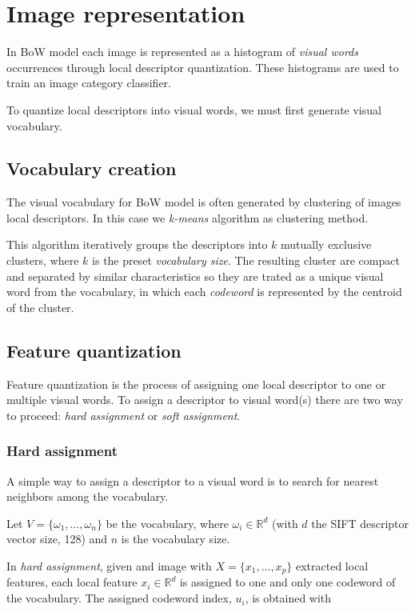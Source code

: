 \section{Image representation}

In BoW model each image is represented as a histogram of \emph{visual words} occurrences through local descriptor quantization\cite{DBLP:journals/corr/abs-1304-5168}. These histograms are used to train an image category classifier.

To quantize local descriptors into visual words, we must first generate visual vocabulary. 

\subsection{Vocabulary creation}

The visual vocabulary for BoW model is often generated by clustering of images local descriptors. In this case we \emph{k-means} algorithm as clustering method.

This algorithm iteratively groups the descriptors into $k$ mutually exclusive clusters, where $k$ is the preset \emph{vocabulary size}. The resulting cluster are compact and separated by similar characteristics so they are trated as a unique visual word from the vocabulary, in which each \emph{codeword} is represented by the centroid of the cluster.

\subsection{Feature quantization}

Feature quantization is the process of assigning one local descriptor to one or multiple
visual words. To assign a descriptor to visual word(s) there are two way to proceed: \emph{hard assignment} or \emph{soft assignment}.

\subsubsection{Hard assignment}

A simple way to assign a descriptor to a visual word is to search for nearest neighbors among the vocabulary.

Let $V = \{\omega_1, \ldots, \omega_n \}$ be the vocabulary, where $\omega_i \in \mathbb{R}^{d}$ (with $d$ the SIFT descriptor vector size, 128) and $n$ is the vocabulary size.

In \emph{hard assignment}, given and image with $X = \{x_1, ..., x_p\}$ extracted local features, each local feature $x_i \in \mathbb{R}^{d}$ is assigned to one and only one codeword of the vocabulary. The assigned codeword index, $u_i$, is obtained with

